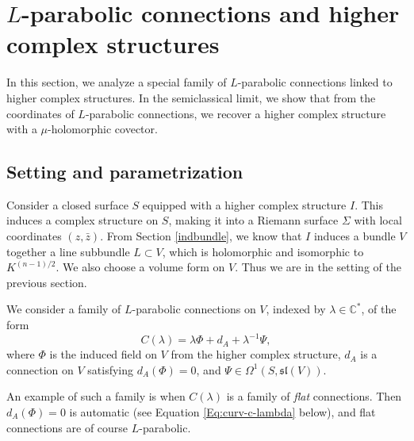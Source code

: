 \documentclass[11pt]{amsart}
\numberwithin{thm}{section} %
\numberwithin{equation}{section} %
\numberwithin{figure}{section} %
\newcommand*{\C}{\mathbb{C}}
\renewcommand*{\S}{S}
\renewcommand*{\l}{\lambda}
\begin{document}
\section{$L$-parabolic connections and higher complex structures}\label{parabolicwithlambda}

In this section, we analyze a special family of $L$-parabolic connections linked to higher complex structures. In the semiclassical limit, we show that from the coordinates of $L$-parabolic connections, we recover a higher complex structure with a $\mu$-holomorphic covector.



\subsection{Setting and parametrization}\label{param-lambda}

Consider a closed surface $\S$ equipped with a higher complex structure $I$. This induces a complex structure on $\S$, making it into a Riemann surface $\Sigma$ with local coordinates $(z,\bar{z})$. From Section \ref{indbundle}, we know that $I$ induces a bundle $V$ together a line subbundle $L\subset V$, which is holomorphic and isomorphic to $K^{(n-1)/2}$. We also choose a volume form on $V$. Thus we are in the setting of the previous section.

We consider a family of $L$-parabolic connections on $V$, indexed by $\l\in\C^*$, of the form
\begin{equation}\label{Eq:3-term-conn}
C(\l)=\l \Phi + d_A + \l^{-1}\Psi,
\end{equation}
where $\Phi$ is the induced field on $V$ from the higher complex structure, $d_A$ is a connection on $V$ satisfying $d_A(\Phi)=0$, and $\Psi\in\Omega^1(S,\mathfrak{sl}(V))$.  

An example of such a family is when $C(\l)$ is a family of \emph{flat} connections. Then $d_A(\Phi)=0$ is automatic (see Equation \eqref{Eq:curv-c-lambda} below), and flat connections are of course $L$-parabolic. 
\end{document}
